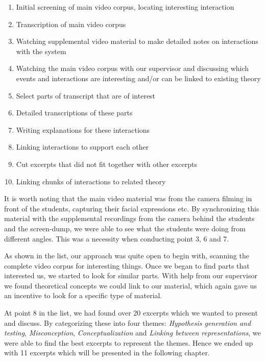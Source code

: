 \begin{enumerate}
\item{Initial screening of main video corpus, locating interesting interaction}
\item{Transcription of main video corpus}
\item{Watching supplemental video material to make detailed notes on interactions with the system}
\item{Watching the main video corpus with our supervisor and discussing which events and interactions are interesting and/or can be linked to existing theory}
\item{Select parts of transcript that are of interest}
\item{Detailed transcriptions of these parts}
\item{Writing explanations for these interactions}
\item{Linking interactions to support each other}
\item{Cut excerpts that did not fit together with other excerpts}
\item{Linking chunks of interactions to related theory}
\end{enumerate}

It is worth noting that the main video material was from the camera filming in front of the students, capturing their facial expressions etc. By synchronizing this material with the supplemental recordings from the camera behind the students and the screen-dump, we were able to see what the students were doing from different angles. This was a necessity when conducting point 3, 6 and 7.

As shown in the list, our approach was quite open to begin with, scanning the complete video corpus for interesting things. Once we began to find parts that interested us, we started to look for similar parts. With help from our supervisor we found theoretical concepts we could link to our material, which again gave us an incentive to look for a specific type of material.

At point 8 in the list, we had found over 20 excerpts which we wanted to present and discuss. By categorizing these into four themes: \emph{Hypothesis generation and testing}, \emph{Misconception}, \emph{Conceptualization} and \emph{Linking between representations}, we were able to find the best excerpts to represent the themes. Hence we ended up with 11 excerpts which will be presented in the following chapter.
